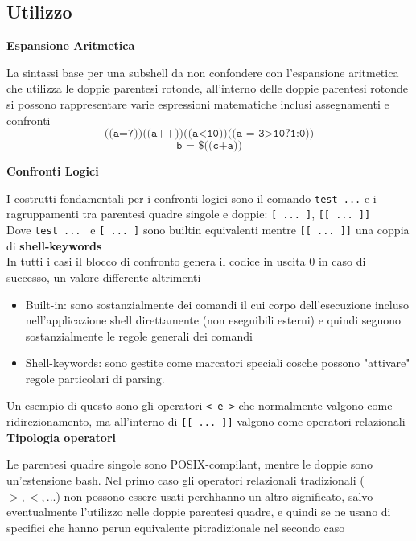 \subsection{Utilizzo}
\begin{flushleft}
  \textbf{Espansione Aritmetica}\par 
  La sintassi base per una subshell \ace da non confondere con l'espansione aritmetica 
  che utilizza le doppie parentesi rotonde, all'interno delle doppie parentesi rotonde
  si possono rappresentare varie espressioni matematiche inclusi assegnamenti e confronti 
  $$\texttt{((a=7))((a++))((a<10))((a = 3>10?1:0))}$$
  $$\texttt{b = \$((c+a))}$$
\end{flushleft}
\begin{flushleft}
  \textbf{Confronti Logici}\par 
  I costrutti fondamentali per i confronti logici sono il comando \texttt{test ...} e i 
  ragruppamenti tra parentesi quadre singole e doppie: \texttt{[ ... ]}, \texttt{[[ ... ]]}\\
  Dove \texttt{test ... } e \texttt{[ ... ]} sono builtin equivalenti mentre 
  \texttt{[[ ... ]]} \ace una coppia di \textbf{shell-keywords} \\
  In tutti i casi il blocco di confronto  genera il codice in uscita 0 in caso di successo, un 
  valore differente altrimenti\par 
  \begin{itemize}
    \item Built-in: sono sostanzialmente dei comandi il cui corpo dell'esecuzione  \ace incluso 
          nell'applicazione shell direttamente (non eseguibili esterni) e quindi seguono sostanzialmente 
          le regole generali dei comandi 
    \item Shell-keywords: sono gestite come marcatori speciali cos\aci che possono 
          "attivare" regole particolari di parsing.
  \end{itemize}
  Un esempio di questo sono gli operatori \texttt{< e >} che normalmente valgono 
  come ridirezionamento, ma all'interno di \texttt{[[ ... ]]} valgono come operatori relazionali\\
  \textbf{Tipologia operatori}\par 
  Le parentesi quadre singole sono POSIX-compilant, mentre le doppie sono un'estensione bash. 
  Nel primo caso gli operatori relazionali tradizionali ($>,<,...$) non possono essere 
  usati perch\ace hanno un altro significato, salvo eventualmente l'utilizzo nelle doppie parentesi quadre, 
  e quindi se ne usano di specifici che hanno per\aco un equivalente pi\acu tradizionale nel secondo caso\\

\end{flushleft}

